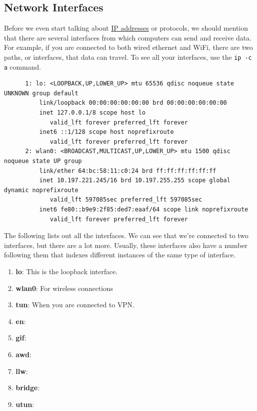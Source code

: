 \documentclass{article}
\newcounter{example}[section]
\begin{document}
  \subsection{Network Interfaces}

    Before we even start talking about \hyperref[def:ip-addresses]{IP addresses} or protocols, we should mention that there are several interfaces from which computers can send and receive data. For example, if you are connected to both wired ethernet and WiFi, there are two paths, or interfaces, that data can travel. To see all your interfaces, use the \texttt{ip -c a} command. 

    \begin{lstlisting} 
      1: lo: <LOOPBACK,UP,LOWER_UP> mtu 65536 qdisc noqueue state UNKNOWN group default  
          link/loopback 00:00:00:00:00:00 brd 00:00:00:00:00:00
          inet 127.0.0.1/8 scope host lo
             valid_lft forever preferred_lft forever
          inet6 ::1/128 scope host noprefixroute 
             valid_lft forever preferred_lft forever
      2: wlan0: <BROADCAST,MULTICAST,UP,LOWER_UP> mtu 1500 qdisc noqueue state UP group 
          link/ether 64:bc:58:11:c0:24 brd ff:ff:ff:ff:ff:ff
          inet 10.197.221.245/16 brd 10.197.255.255 scope global dynamic noprefixroute 
             valid_lft 597085sec preferred_lft 597085sec
          inet6 fe80::b9e9:2f85:ded7:eaaf/64 scope link noprefixroute 
             valid_lft forever preferred_lft forever
    \end{lstlisting}

    The following lists out all the interfaces. We can see that we're connected to two interfaces, but there are a lot more. Usually, these interfaces also have a number following them that indexes different instances of the same type of interface. 

    \begin{enumerate} 
      \item \textbf{lo}: This is the loopback interface. 
      \item \textbf{wlan0}: For wireless connections 
      \item \textbf{tun}: When you are connected to VPN. 
      \item \textbf{en}: 
      \item \textbf{gif}: 
      \item \textbf{awd}: 
      \item \textbf{llw}: 
      \item \textbf{bridge}: 
      \item \textbf{utun}: 
    \end{enumerate}
\end{document}
